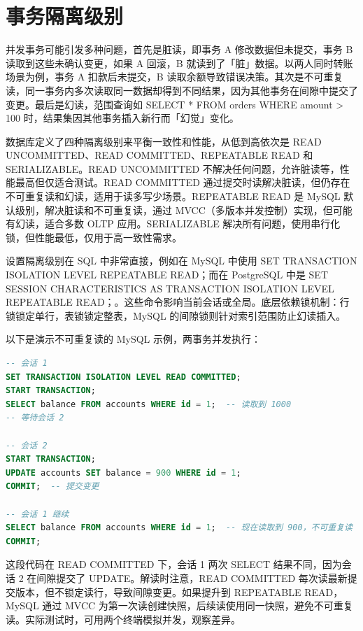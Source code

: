 \chapter{事务隔离级别}
并发事务可能引发多种问题，首先是脏读，即事务 A 修改数据但未提交，事务 B 读取到这些未确认变更，如果 A 回滚，B 就读到了「脏」数据。以两人同时转账场景为例，事务 A 扣款后未提交，B 读取余额导致错误决策。其次是不可重复读，同一事务内多次读取同一数据却得到不同结果，因为其他事务在间隙中提交了变更。最后是幻读，范围查询如 SELECT * FROM orders WHERE amount > 100 时，结果集因其他事务插入新行而「幻觉」变化。\par
数据库定义了四种隔离级别来平衡一致性和性能，从低到高依次是 READ UNCOMMITTED、READ COMMITTED、REPEATABLE READ 和 SERIALIZABLE。READ UNCOMMITTED 不解决任何问题，允许脏读等，性能最高但仅适合测试。READ COMMITTED 通过提交时读解决脏读，但仍存在不可重复读和幻读，适用于读多写少场景。REPEATABLE READ 是 MySQL 默认级别，解决脏读和不可重复读，通过 MVCC（多版本并发控制）实现，但可能有幻读，适合多数 OLTP 应用。SERIALIZABLE 解决所有问题，使用串行化锁，但性能最低，仅用于高一致性需求。\par
设置隔离级别在 SQL 中非常直接，例如在 MySQL 中使用 SET TRANSACTION ISOLATION LEVEL REPEATABLE READ；而在 PostgreSQL 中是 SET SESSION CHARACTERISTICS AS TRANSACTION ISOLATION LEVEL REPEATABLE READ；。这些命令影响当前会话或全局。底层依赖锁机制：行锁锁定单行，表锁锁定整表，MySQL 的间隙锁则针对索引范围防止幻读插入。\par
以下是演示不可重复读的 MySQL 示例，两事务并发执行：\par
\begin{lstlisting}[language=sql]
-- 会话 1
SET TRANSACTION ISOLATION LEVEL READ COMMITTED;
START TRANSACTION;
SELECT balance FROM accounts WHERE id = 1;  -- 读取到 1000
-- 等待会话 2

-- 会话 2
START TRANSACTION;
UPDATE accounts SET balance = 900 WHERE id = 1;
COMMIT;  -- 提交变更

-- 会话 1 继续
SELECT balance FROM accounts WHERE id = 1;  -- 现在读取到 900，不可重复读
COMMIT;
\end{lstlisting}
这段代码在 READ COMMITTED 下，会话 1 两次 SELECT 结果不同，因为会话 2 在间隙提交了 UPDATE。解读时注意，READ COMMITTED 每次读最新提交版本，但不锁定读行，导致间隙变更。如果提升到 REPEATABLE READ，MySQL 通过 MVCC 为第一次读创建快照，后续读使用同一快照，避免不可重复读。实际测试时，可用两个终端模拟并发，观察差异。\par
